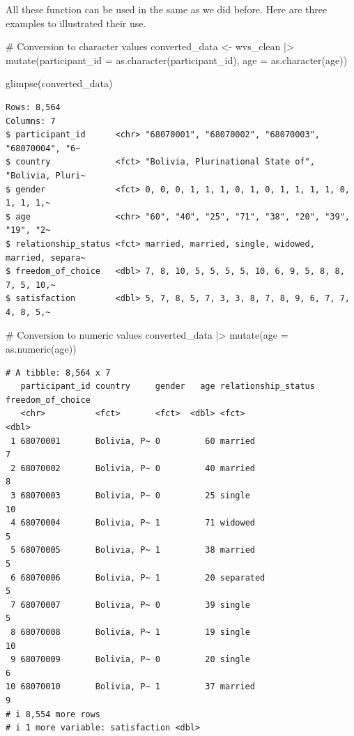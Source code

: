 \documentclass[
  letterpaper,
]{krantz}
\makeatletter
\newenvironment{Shaded}{\begin{snugshade}}{\end{snugshade}}
\newcommand{\AttributeTok}[1]{\textcolor[rgb]{0.40,0.45,0.13}{#1}}
\newcommand{\CommentTok}[1]{\textcolor[rgb]{0.37,0.37,0.37}{#1}}
\newcommand{\FunctionTok}[1]{\textcolor[rgb]{0.28,0.35,0.67}{#1}}
\newcommand{\NormalTok}[1]{\textcolor[rgb]{0.00,0.23,0.31}{#1}}
\newcommand{\OtherTok}[1]{\textcolor[rgb]{0.00,0.23,0.31}{#1}}
\newcommand{\SpecialCharTok}[1]{\textcolor[rgb]{0.37,0.37,0.37}{#1}}
\newenvironment{kframe}{%
\medskip{}
\setlength{\fboxsep}{.8em}
 \def\at@end@of@kframe{}%
 \ifinner\ifhmode%
  \def\at@end@of@kframe{\end{minipage}}%
  \begin{minipage}{\columnwidth}%
 \fi\fi%
 \def\FrameCommand##1{\hskip\@totalleftmargin \hskip-\fboxsep
 \colorbox{shadecolor}{##1}\hskip-\fboxsep
     \hskip-\linewidth \hskip-\@totalleftmargin \hskip\columnwidth}%
 \MakeFramed {\advance\hsize-\width
   \@totalleftmargin\z@ \linewidth\hsize
   \@setminipage}}%
 {\par\unskip\endMakeFramed%
 \at@end@of@kframe}
\renewenvironment{Shaded}{\begin{kframe}}{\end{kframe}}
\makeatother
\begin{document}
All these function can be used in the same as we did before. Here are
three examples to illustrated their use.

\begin{Shaded}
\begin{Highlighting}[]
\CommentTok{\# Conversion to character values}
\NormalTok{converted\_data }\OtherTok{\textless{}{-}}
\NormalTok{  wvs\_clean }\SpecialCharTok{|\textgreater{}}
  \FunctionTok{mutate}\NormalTok{(}\AttributeTok{participant\_id =} \FunctionTok{as.character}\NormalTok{(participant\_id),}
         \AttributeTok{age =} \FunctionTok{as.character}\NormalTok{(age))}

\FunctionTok{glimpse}\NormalTok{(converted\_data)}
\end{Highlighting}
\end{Shaded}

\begin{verbatim}
Rows: 8,564
Columns: 7
$ participant_id      <chr> "68070001", "68070002", "68070003", "68070004", "6~
$ country             <fct> "Bolivia, Plurinational State of", "Bolivia, Pluri~
$ gender              <fct> 0, 0, 0, 1, 1, 1, 0, 1, 0, 1, 1, 1, 1, 0, 1, 1, 1,~
$ age                 <chr> "60", "40", "25", "71", "38", "20", "39", "19", "2~
$ relationship_status <fct> married, married, single, widowed, married, separa~
$ freedom_of_choice   <dbl> 7, 8, 10, 5, 5, 5, 5, 10, 6, 9, 5, 8, 8, 7, 5, 10,~
$ satisfaction        <dbl> 5, 7, 8, 5, 7, 3, 3, 8, 7, 8, 9, 6, 7, 7, 4, 8, 5,~
\end{verbatim}

\begin{Shaded}
\begin{Highlighting}[]
\CommentTok{\# Conversion to numeric values}
\NormalTok{converted\_data }\SpecialCharTok{|\textgreater{}}
  \FunctionTok{mutate}\NormalTok{(}\AttributeTok{age =} \FunctionTok{as.numeric}\NormalTok{(age))}
\end{Highlighting}
\end{Shaded}

\begin{verbatim}
# A tibble: 8,564 x 7
   participant_id country     gender   age relationship_status freedom_of_choice
   <chr>          <fct>       <fct>  <dbl> <fct>                           <dbl>
 1 68070001       Bolivia, P~ 0         60 married                             7
 2 68070002       Bolivia, P~ 0         40 married                             8
 3 68070003       Bolivia, P~ 0         25 single                             10
 4 68070004       Bolivia, P~ 1         71 widowed                             5
 5 68070005       Bolivia, P~ 1         38 married                             5
 6 68070006       Bolivia, P~ 1         20 separated                           5
 7 68070007       Bolivia, P~ 0         39 single                              5
 8 68070008       Bolivia, P~ 1         19 single                             10
 9 68070009       Bolivia, P~ 0         20 single                              6
10 68070010       Bolivia, P~ 1         37 married                             9
# i 8,554 more rows
# i 1 more variable: satisfaction <dbl>
\end{verbatim}
\end{document}
